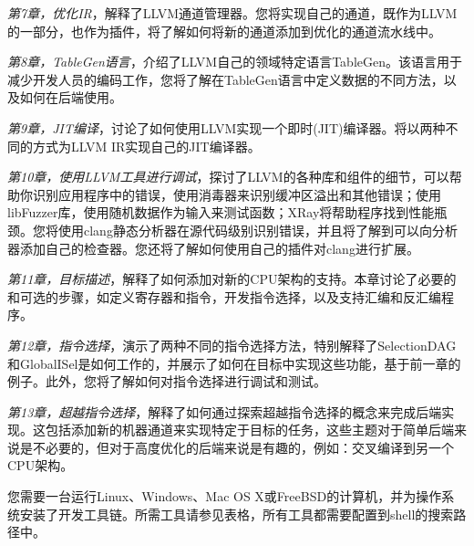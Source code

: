 \textit{第7章，优化IR}，解释了LLVM通道管理器。您将实现自己的通道，既作为LLVM的一部分，也作为插件，将了解如何将新的通道添加到优化的通道流水线中。

\textit{第8章，TableGen语言}，介绍了LLVM自己的领域特定语言TableGen。该语言用于减少开发人员的编码工作，您将了解在TableGen语言中定义数据的不同方法，以及如何在后端使用。

\textit{第9章，JIT编译}，讨论了如何使用LLVM实现一个即时(JIT)编译器。将以两种不同的方式为LLVM IR实现自己的JIT编译器。

\textit{第10章，使用LLVM工具进行调试}，探讨了LLVM的各种库和组件的细节，可以帮助你识别应用程序中的错误，使用消毒器来识别缓冲区溢出和其他错误；使用libFuzzer库，使用随机数据作为输入来测试函数；XRay将帮助程序找到性能瓶颈。您将使用clang静态分析器在源代码级别识别错误，并且将了解到可以向分析器添加自己的检查器。您还将了解如何使用自己的插件对clang进行扩展。

\textit{第11章，目标描述}，解释了如何添加对新的CPU架构的支持。本章讨论了必要的和可选的步骤，如定义寄存器和指令，开发指令选择，以及支持汇编和反汇编程序。

\textit{第12章，指令选择}，演示了两种不同的指令选择方法，特别解释了SelectionDAG和GlobalISel是如何工作的，并展示了如何在目标中实现这些功能，基于前一章的例子。此外，您将了解如何对指令选择进行调试和测试。

\textit{第13章，超越指令选择}，解释了如何通过探索超越指令选择的概念来完成后端实现。这包括添加新的机器通道来实现特定于目标的任务，这些主题对于简单后端来说是不必要的，但对于高度优化的后端来说是有趣的，例如：交叉编译到另一个CPU架构。


您需要一台运行Linux、Windows、Mac OS X或FreeBSD的计算机，并为操作系统安装了开发工具链。所需工具请参见表格，所有工具都需要配置到shell的搜索路径中。

